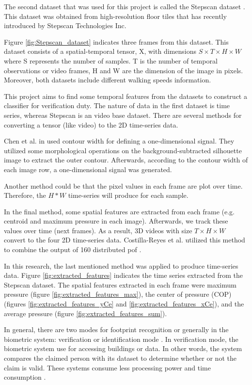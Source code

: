 The second dataset that was used for this project is called the Stepscan dataset \cite{Connor2015ComparingBiometrics}. This dataset was obtained from high-resolution floor tiles that has recently introduced by Stepscan Technologies Inc.

Figure \ref{fig:Stepscan_dataset} indicates three frames from this dataset. This dataset consists of a spatial-temporal tensor, X, with dimensions $S \times T \times H \times W$ where S represents the number of samples. T is the number of temporal observations or video frames, H and W are the dimension of the image in pixels. Moreover, both datasets include different walking speeds information. 

This project aims to find some temporal features from the datasets to construct a classifier for verification duty. The nature of data in the first dataset is time series, whereas Stepscan is an video base dataset. There are several methods for converting a tensor (like video) to the 2D time-series data. 

Chen et al. in \cite{Chen2006GaitModel} used contour width for defining a one-dimensional signal. They utilized some morphological operations on the background-subtracted silhouette image to extract the outer contour. Afterwards, according to the contour width of each image row, a one-dimensional signal was generated.

Another method could be that the pixel values in each frame are plot over time. Therefore, the $H * W$ time-series will produce for each sample.

In the final method, some spatial features are extracted from each frame (e.g. centroid and maximum pressure in each image). Afterwards, we track these values over time (next frames). As a result, 3D videos with size $T \times H \times W$ convert to the four 2D time-series data. Costilla-Reyes et al. utilized this method to combine the output of 160 distributed \gls{pof} \cite{Costilla-Reyes2018DeepSensors}.

In this research, the last mentioned method was applied to produce time-series data. Figure \ref{fig:extracted_features} indicates the time series extracted from the Stepscan dataset. The spatial features extracted in each frame were maximum pressure (figure \ref{fig:extracted_features_max}), the center of pressure (COP) (figures \ref{fig:extracted_features_yCe} and \ref{fig:extracted_features_xCe}), and the average pressure (figure \ref{fig:extracted_features_sum}). 

In general, there are two modes for footprint recognition or generally in the biometric system: verification or identification mode \cite{Jain2004AnRecognition}. In verification mode, the biometric system use for accessing buildings or data. In other words, the system compares the claimed person with its dataset to determine whether or not the claim is valid. These systems consume less processing power and time consumption \cite{Jain2004AnRecognition}. 

